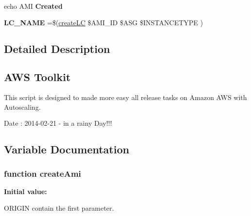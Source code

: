 \begin{DoxyCompactItemize}
\item 
\hypertarget{aws-toolkit_8bash_acde37efb13242b02c1cad5f7b8321172}{echo A\-M\-I {\bfseries Created}}\label{aws-toolkit_8bash_acde37efb13242b02c1cad5f7b8321172}

\item 
\hypertarget{aws-toolkit_8bash_a2d7850a2c89116e754dd9dab70aa3be2}{{\bfseries L\-C\-\_\-\-N\-A\-M\-E} =\$(\hyperlink{aws-toolkit_8bash_a79e86254590fd77e490803185cfe540a}{create\-L\-C} \$A\-M\-I\-\_\-\-I\-D \$A\-S\-G \$I\-N\-S\-T\-A\-N\-C\-E\-T\-Y\-P\-E )}\label{aws-toolkit_8bash_a2d7850a2c89116e754dd9dab70aa3be2}

\end{DoxyCompactItemize}


\subsection{Detailed Description}
\subsection*{A\-W\-S Toolkit }

This script is designed to made more easy all release tasks on Amazon A\-W\-S with Autoscaling. \begin{DoxyDate}{Date}
\-: 2014-\/02-\/21 -\/ in a rainy Day!!! 
\end{DoxyDate}


\subsection{Variable Documentation}
\hypertarget{aws-toolkit_8bash_a2ebd8586d38b898323df862fe6082064}{
\subsubsection[{create\-Ami}]{\setlength{\rightskip}{0pt plus 5cm}function create\-Ami}}\label{aws-toolkit_8bash_a2ebd8586d38b898323df862fe6082064}
{\bfseries Initial value\-:}


O\-R\-I\-G\-I\-N contain the first parameter. 

